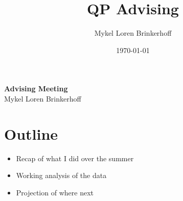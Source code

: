\documentclass[12pt, letterpaper]{article}
\title{QP Advising}
\author{Mykel Loren Brinkerhoff}
\date{\today}
\begin{document}
	
	\setlength{\Extopsep}{6pt}
	\setlength{\Exlabelsep}{9pt}		%
	
	
\begin{center}
	{\Large \textbf{Advising Meeting }}\\
	\vspace{6pt}
	Mykel Loren Brinkerhoff
\end{center}
\thispagestyle{fancy}

\section*{Outline}

\begin{itemize}
	\item Recap of what I did over the summer
	\item Working analysis of the data
	\item Projection of where next
\end{itemize}

\end{document}
